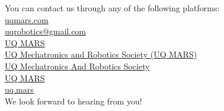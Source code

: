 \documentclass[a4paper,12pt]{report}
\begin{document}
\large
\onehalfspacing
You can contact us through any of the following platforms: \\
\faLink{} \href{https://www.uqmars.com}{uqmars.com} \\
\faEnvelope{} \href{mailto:uqrobotics@gmail.com}{uqrobotics@gmail.com} \\
\faFacebookSquare{} \href{https://facebook.com/UQMARS}{UQ MARS} \\
\faLinkedinSquare{} \href{https://linkedin.com/company/uq-mars}{UQ Mechatronics and Robotics Society (UQ MARS)} \\
\faGithubSquare{} \href{https://github.com/uqmars}{UQ Mechatronics And Robotics Society} \\
\faYoutubePlay{} \href{https://www.youtube.com/channel/UCH3GjoKLL3R_1ayjkn9C78A}{UQ MARS} \\
\faInstagram{} \href{https://www.instagram.com/uq.mars/}{uq.mars} \\
We look forward to hearing from you!
\end{document}
